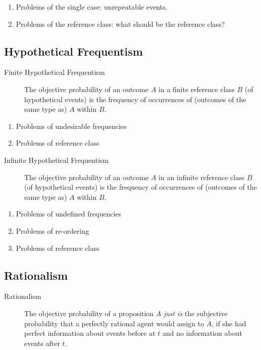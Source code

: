 \documentclass[12pt]{article}
\theoremstyle{definition}
\begin{document}
\begin{enumerate}
\item Problems of the single case: unrepeatable events.
\item Problems of the reference class: what should be the reference class?
\end{enumerate}


\subsection{Hypothetical Frequentism}
\begin{description}
\item[Finite Hypothetical Frequentism] The objective probability of an outcome $A$ in a finite reference class $B$ (of hypothetical events) is the frequency of occurrences of (outcomes of the same type as) $A$ within $B$.
\end{description}
\begin{enumerate}
\item Problems of undesirable frequencies
\item Problems of reference class
\end{enumerate}

\begin{description}
\item[Infinite Hypothetical Frequentism] The objective probability of an outcome $A$ in an infinite reference class $B$ (of hypothetical events) is the frequency of occurrences of (outcomes of the same type as) $A$ within $B$.
\end{description}
\begin{enumerate}
\item Problems of undefined frequencies
\item Problems of re-ordering
\item Problems of reference class
\end{enumerate}

\subsection{Rationalism}
\begin{description}
\item[Rationalism] The objective probability of a proposition $A$ \textit{just is} the subjective probability that a perfectly rational agent would assign to $A$, if she had perfect information about events before at $t$ and no information about events after $t$.
\end{description}
\end{document}
